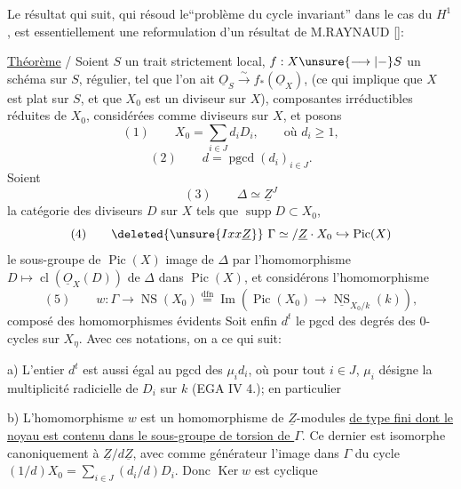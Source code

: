 
Le résultat qui suit, qui résoud le``problème du cycle invariant'' dans le cas du $H^1$, est essentiellement une reformulation d'un résultat de M.RAYNAUD [\quad]:
\margin{$\times$}

\uline{Théorème} / Soient $S$ un trait strictement local, $f:X\unsure{\longrightarrow|\mathbin{-}}S$ un schéma  sur $S$, régulier, tel que l'on ait $\underline{O}_S\xrightarrow{\sim}f_*(\underline{O}_X)$, (ce qui implique que $X$ est plat sur $S$, et que $X_0$ est un diviseur sur $X$),  composantes irréductibles réduites de $X_0$, considérées comme diviseurs sur $X$, et posons \unsure{$\times$}
\[
(1)\qquad X_0=\sum_{i\in J}d_iD_i,\qquad\text{où }d_i\geq1,
\]
\[
(2)\qquad d=\operatorname{pgcd}(d_i)_{i\in J}.
\]
Soient
\[
(3)\qquad\Delta\simeq\underline{Z}^{J}
\]
la catégorie des diviseurs $D$ sur $X$ tels que $\operatorname{supp}D\subset X_0$, 
\[
(4)\qquad\deleted{\unsure{Ixx\underline Z}}\ \Gamma\simeq/\underline Z\cdot X_0\hookrightarrow\operatorname{Pic}(X)
\]
le  sous-groupe de $\operatorname{Pic}(X)$ image de $\Delta$ par l'homomorphisme $D\mapsto\operatorname{cl}(\underline{O}_X(D))$ de $\Delta$ dans $\operatorname{Pic}(X)$, et considérons l'homomorphisme 
\[
(5)\qquad w:\Gamma\longrightarrow\operatorname{NS}(X_0)\overset{\mathrm{dfn}}{=}\operatorname{Im}(\operatorname{Pic}(X_0)\longrightarrow\underline{\operatorname{NS}}_{X_0/k}(k)),
\]
composé des homomorphismes évidents
Soit enfin $d^t$ le pgcd des degrés des 0-cycles sur $X_\eta$. Avec ces notations, on a ce qui suit:

a) L'entier $d^t$ est aussi égal au pgcd des $\mu_i d_i$, où pour tout $i\in J$, $\mu_i$ désigne la multiplicité radicielle de $D_i$ sur $k$ (EGA IV 4.\quad); en particulier 
\margin{$\times$}

b) L'homomorphisme $w$ est un homomorphisme de $\underline Z$-modules \uline{de type fini dont le noyau est contenu dans le sous-groupe de torsion de $\Gamma$}. Ce dernier est isomorphe canoniquement à $\underline Z/d\underline Z$, avec comme générateur l'image dans $\Gamma$ du cycle $(1/d)X_0=\sum_{i\in J}(d_i/d)D_i$. Donc $\operatorname{Ker}w$ est cyclique

